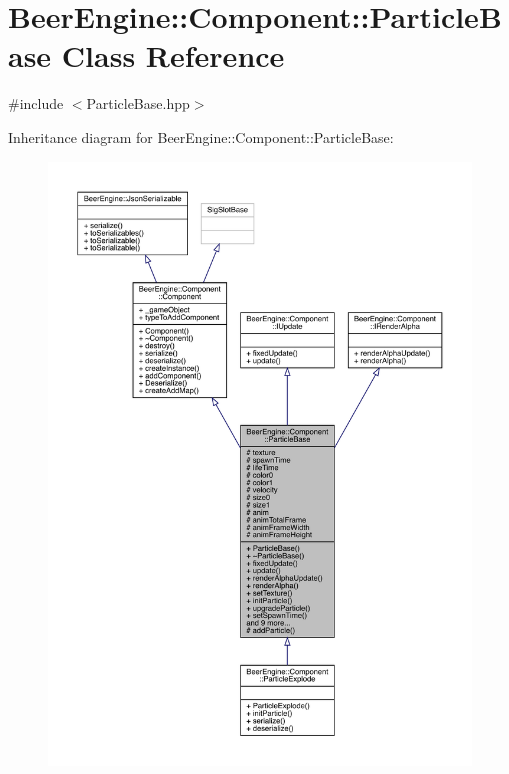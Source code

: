 \hypertarget{class_beer_engine_1_1_component_1_1_particle_base}{}\section{Beer\+Engine\+:\+:Component\+:\+:Particle\+Base Class Reference}
\label{class_beer_engine_1_1_component_1_1_particle_base}


{\ttfamily \#include $<$Particle\+Base.\+hpp$>$}



Inheritance diagram for Beer\+Engine\+:\+:Component\+:\+:Particle\+Base\+:\nopagebreak
\begin{figure}[H]
\begin{center}
\leavevmode
\includegraphics[width=350pt]{class_beer_engine_1_1_component_1_1_particle_base__inherit__graph}
\end{center}
\end{figure}


